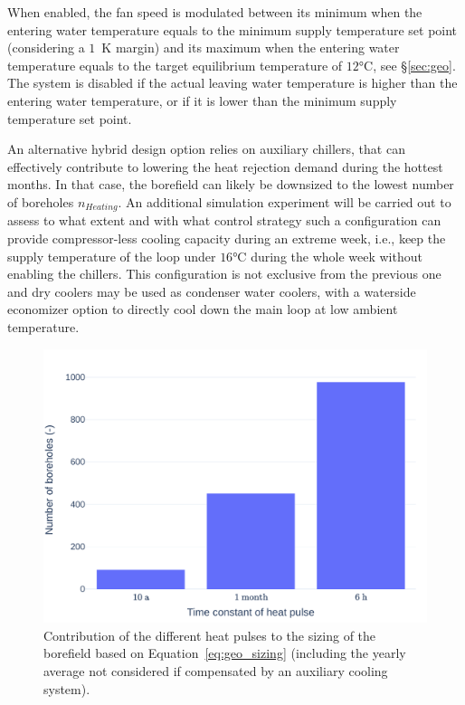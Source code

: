 When enabled, the fan speed is modulated between its minimum when the entering water temperature equals to the minimum supply temperature set point (considering a $1$~K margin) and its maximum when the entering water temperature equals to the target equilibrium temperature of $12$°C, see §\ref{sec:geo}.
The system is disabled if the actual leaving water temperature is higher than the entering water temperature, or if it is lower than the minimum supply temperature set point.

An alternative hybrid design option relies on auxiliary chillers, that can effectively contribute to lowering the heat rejection demand during the hottest months. In that case, the borefield can likely be downsized to the lowest number of boreholes $n_{Heating}$.
An additional simulation experiment will be carried out to assess to what extent and with what control strategy such a configuration can provide compressor-less cooling capacity during an extreme week, i.e., keep the supply temperature of the loop under $16$°C during the whole week without enabling the chillers. This configuration is not exclusive from the previous one and dry coolers may be used as condenser water coolers, with a waterside economizer option to directly cool down the main loop at low ambient temperature.

\begin{figure}[!htbp]
    \centering
    \includegraphics[width=.6\linewidth]{../python_scripts/figures/ContributionL.pdf}
    \caption{Contribution of the different heat pulses to the sizing of the borefield based on  Equation~\ref{eq:geo_sizing} (including the yearly average not considered if compensated by an auxiliary cooling system).}
    \label{fig:contribution_to_L}
\end{figure}

